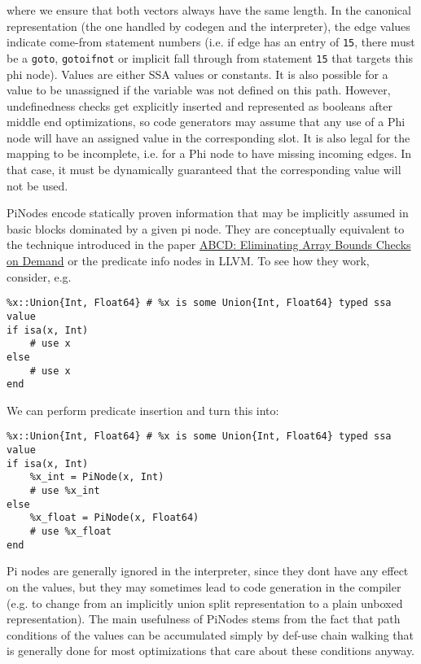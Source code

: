 where we ensure that both vectors always have the same length. In the canonical representation (the one handled by codegen and the interpreter), the edge values indicate come-from statement numbers (i.e. if edge has an entry of \texttt{15}, there must be a \texttt{goto}, \texttt{gotoifnot} or implicit fall through from statement \texttt{15} that targets this phi node). Values are either SSA values or constants. It is also possible for a value to be unassigned if the variable was not defined on this path. However, undefinedness checks get explicitly inserted and represented as booleans after middle end optimizations, so code generators may assume that any use of a Phi node will have an assigned value in the corresponding slot. It is also legal for the mapping to be incomplete, i.e. for a Phi node to have missing incoming edges. In that case, it must be dynamically guaranteed that the corresponding value will not be used.



PiNodes encode statically proven information that may be implicitly assumed in basic blocks dominated by a given pi node. They are conceptually equivalent to the technique introduced in the paper \href{https://dl.acm.org/citation.cfm?id=358438.349342}{ABCD: Eliminating Array Bounds Checks on Demand} or the predicate info nodes in LLVM. To see how they work, consider, e.g.




\begin{verbatim}
%x::Union{Int, Float64} # %x is some Union{Int, Float64} typed ssa value
if isa(x, Int)
    # use x
else
    # use x
end
\end{verbatim}



We can perform predicate insertion and turn this into:




\begin{verbatim}
%x::Union{Int, Float64} # %x is some Union{Int, Float64} typed ssa value
if isa(x, Int)
    %x_int = PiNode(x, Int)
    # use %x_int
else
    %x_float = PiNode(x, Float64)
    # use %x_float
end
\end{verbatim}



Pi nodes are generally ignored in the interpreter, since they don{\textquotesingle}t have any effect on the values, but they may sometimes lead to code generation in the compiler (e.g. to change from an implicitly union split representation to a plain unboxed representation). The main usefulness of PiNodes stems from the fact that path conditions of the values can be accumulated simply by def-use chain walking that is generally done for most optimizations that care about these conditions anyway.



